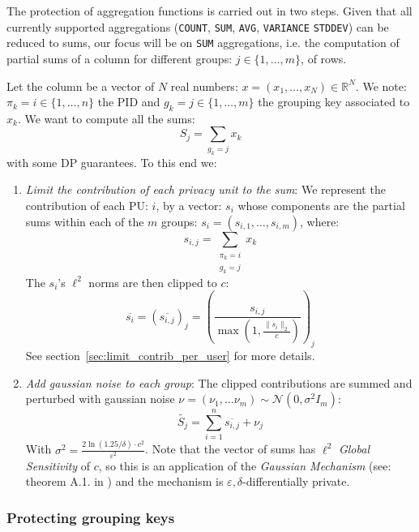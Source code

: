\documentclass{article}
\begin{document}
    The protection of aggregation functions is carried out in two steps. Given that all currently supported aggregations (\texttt{COUNT}, \texttt{SUM}, \texttt{AVG}, \texttt{VARIANCE} \texttt{STDDEV}) can be reduced to sums, our focus will be on \texttt{SUM} aggregations, i.e. the computation of partial sums of a column for different groups: $j\in\{1,\ldots,m\}$, of rows.
    
    Let the column be a vector of $N$ real numbers: $x = \left(x_1,\ldots, x_N\right)\in\mathbb{R}^N$. We note: $\pi_k = i \in \{1,\ldots,n\}$ the PID and $g_k = j \in \{1,\ldots,m\}$ the grouping key associated to $x_k$.
    We want to compute all the sums:
    $$S_j = \sum_{g_k = j} x_k$$
    with some DP guarantees. To this end we:
    
    \begin{enumerate}
        \item \emph{Limit the contribution of each \emph{privacy unit} to the sum}:
        We represent the contribution of each PU: $i$, by a vector: $s_i$ whose components are the partial sums within each of the $m$ groups: $s_i = \left(s_{i,1},\ldots, s_{i,m}\right)$, where:
        $$s_{i,j} = \sum_{\substack{\pi_k = i\\g_k = j}}x_k$$
        The $s_i$'s $\ell^2$ norms are then clipped to $c$:
        $$\overline{s_i} = \left(\overline{s_{i,j}}\right)_j = \left(\frac{s_{i,j}}{\max\left(1, \frac{\|s_i\|_2}{c}\right)}\right)_j$$
        See section~\ref{sec:limit_contrib_per_user} for more details.
    
        \item \emph{Add gaussian noise to each group}:
        The clipped contributions are summed and perturbed with gaussian noise $\nu = \left(\nu_1,\ldots \nu_m\right) \sim \mathcal{N}\left(0, \sigma^2I_m\right)$:
        $$\widetilde{S_j} = \sum_{i=1}^n \overline{s_{i,j}} + \nu_j$$
        With $\sigma^2={\frac {2\ln(1.25/\delta )\cdot c^{2}}{\varepsilon ^{2}}}$.
        Note that the vector of sums has $\ell^2$ \emph{Global Sensitivity} of $c$, so this is an application of the \emph{Gaussian Mechanism} (see: theorem A.1. in \cite{dwork2014algorithmic}) and the mechanism is $\varepsilon, \delta$-differentially private.
    \end{enumerate}
    
    \subsubsection{Protecting grouping keys}
    
\end{document}

